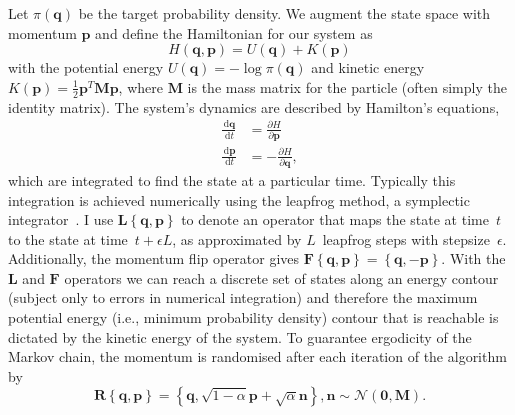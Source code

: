 \documentclass{article}
\newcommand{\dd}{\, \mathrm{d}}
\renewcommand{\vec}[1]{\ensuremath{\mathbf{#1}}}
\newcommand{\mat}[1]{\ensuremath{\mathbf{#1}}}
\newcommand{\op}[1]{\ensuremath{\mathbf{#1}}}
\newcommand{\norm}{\ensuremath{\mathcal{N}}}
\begin{document}
    Let $\pi\left(\vec{q}\right)$ be the target probability density.
    We augment the state space with momentum $\vec{p}$ and define the
        Hamiltonian for our system as
        \begin{equation}
            H\left(\vec{q},\vec{p}\right)
            = U\left(\vec{q}\right) + K\left(\vec{p}\right)
        \end{equation}
        with the potential energy
        $U\left(\vec{q}\right) = -\log{\pi\left(\vec{q}\right)}$ and kinetic
        energy $K\left(\vec{p}\right) = \frac{1}{2} \vec{p}^T \mat{M} \vec{p}$,
        where $\mat{M}$ is the mass matrix for the particle (often simply the
        identity matrix).
    The system's dynamics are described by Hamilton's equations,
        \begin{align}
            \frac{\dd \vec{q}}{\dd t} &= \frac{\partial H}{\partial \vec{p}} \\
            \frac{\dd \vec{p}}{\dd t} &= -\frac{\partial H}{\partial \vec{q}},
        \end{align}
        which are integrated to find the state at a particular time.
    Typically this integration is achieved numerically using the leapfrog
        method, a symplectic integrator~\cite{Nea11}.
    I use $\op{L}\left\{\vec{q},\vec{p}\right\}$ to denote an operator that
        maps the state at time~$t$ to the state at time~$t + \epsilon L$, as
        approximated by $L$~leapfrog steps with stepsize~$\epsilon$.
    Additionally, the momentum flip operator gives
        $\op{F}\left\{\vec{q},\vec{p}\right\}
         = \left\{\vec{q},-\vec{p}\right\}$.
    With the $\op{L}$ and $\op{F}$ operators we can reach a discrete set of
        states along an energy contour (subject only to errors in numerical
        integration) and therefore the maximum potential energy (i.e., minimum
        probability density) contour that is reachable is dictated by the
        kinetic energy of the system.
    To guarantee ergodicity of the Markov chain, the momentum is randomised
        after each iteration of the algorithm by
    \begin{equation}
        \op{R}\left\{\vec{q},\vec{p}\right\} =
        \left\{\vec{q}, \sqrt{1-\alpha}\vec{p} + \sqrt{\alpha}\vec{n}\right\},
        \vec{n} \sim \norm\left(\vec{0}, \mat{M}\right).
    \end{equation}
\end{document}
